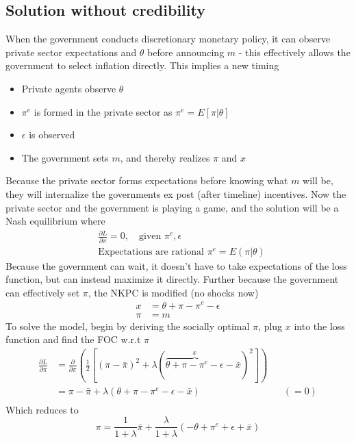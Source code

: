 \documentclass[12pt, a4paper]{article}
\begin{document}
\begin{spacing}{1.213}
\subsection{Solution without credibility}
When the government conducts discretionary monetary policy, it can observe private sector expectations and $\theta$ before announcing $m$ - this effectively allows the government to select inflation directly. This implies a new timing
\begin{itemize}
\item Private agents observe $\theta$
\item $\pi^e$ is formed in the private sector as $\pi^e = E[\pi|\theta]$
\item $\epsilon$ is observed
\item The government sets $m$, and thereby realizes $\pi$ and $x$
\end{itemize}
Because the private sector forms expectations before knowing what $m$ will be, they will internalize the governments ex post (after timeline) incentives. Now the private sector and the government is playing a game, and the solution will be a Nash equilibrium where
\begin{align}
&\frac{\partial L}{\partial \pi} = 0, \quad \textrm{given } \pi^e, \epsilon \\
& \textrm{Expectations are rational } \pi^e = E(\pi|\theta)
\end{align}
Because the government can wait, it doesn't have to take expectations of the loss function, but can instead maximize it directly. Further because the government can effectively set $\pi$, the NKPC is modified (no shocks now)
\begin{align*}
x&= \theta + \pi - \pi^e - \epsilon \\
\pi &= m
\end{align*}
To solve the model, begin by deriving the socially optimal $\pi$, plug $x$ into the loss function and find the FOC w.r.t $\pi$
\begin{align*}
\frac{\partial L}{\partial \pi} &= \frac{\partial }{\partial \pi} \left(  \frac{1}{2}[(\pi - \bar{\pi})^2 + \lambda(\overbrace{\theta + \pi - \pi^e - \epsilon}^{x} - \bar{x})^2 ] \right) \\
& = \pi - \bar{\pi} + \lambda(\theta + \pi - \pi^e - \epsilon - \bar{x}) && (=0) \\
\end{align*}
Which reduces to
\begin{equation} \label{eq: optuncredpi}
\pi = \frac{1}{1+ \lambda} \bar{\pi} + \frac{\lambda}{1+ \lambda}(- \theta + \pi^e + \epsilon + \bar{x})

\end{equation}
\end{spacing}
\end{document}
